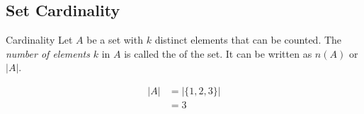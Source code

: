 \documentclass[../notes.tex]{subfiles}
\begin{document}
			\subsection{Set Cardinality}
				\begin{definition}{Cardinality}
					Let $A$ be a set with $k$ distinct elements that can be counted. The \emph{number of elements} $k$ in $A$ is called the  of the set. It can be written as $n(A)$ or $\left\lvert A\right\rvert$.
				\end{definition}
				\nopagebreak
				\begin{example} \moveup
					\begin{align*}
						\left\lvert A\right\rvert &= \bigl\lvert \{1, 2, 3\}\bigr\rvert\\
						&= 3
					\end{align*}
				\end{example}
\end{document}
